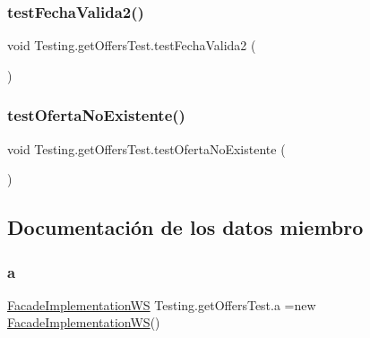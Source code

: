 \mbox{\label{class_testing_1_1get_offers_test_a71e1b54d6cb2a107543498540ea56803}} 
\subsubsection{\texorpdfstring{testFechaValida2()}{testFechaValida2()}}
{\footnotesize\ttfamily void Testing.\+get\+Offers\+Test.\+test\+Fecha\+Valida2 (\begin{DoxyParamCaption}{ }\end{DoxyParamCaption})}

\mbox{\label{class_testing_1_1get_offers_test_a21fd531ddb00f1073b1068e5ec32064b}} 
\subsubsection{\texorpdfstring{testOfertaNoExistente()}{testOfertaNoExistente()}}
{\footnotesize\ttfamily void Testing.\+get\+Offers\+Test.\+test\+Oferta\+No\+Existente (\begin{DoxyParamCaption}{ }\end{DoxyParamCaption})}



\subsection{Documentación de los datos miembro}
\mbox{\label{class_testing_1_1get_offers_test_a5a94d6f9909d85742e140e7030f81d5a}} 
\subsubsection{\texorpdfstring{a}{a}}
{\footnotesize\ttfamily \mbox{\hyperlink{classbusiness_logic_1_1_facade_implementation_w_s}{Facade\+Implementation\+WS}} Testing.\+get\+Offers\+Test.\+a =new \mbox{\hyperlink{classbusiness_logic_1_1_facade_implementation_w_s}{Facade\+Implementation\+WS}}()}

